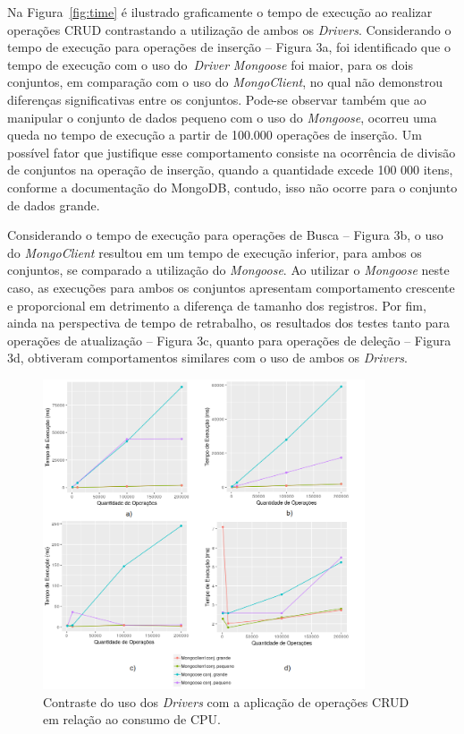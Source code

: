\documentclass[12pt]{article}
\begin{document}
Na Figura~\ref{fig:time} é ilustrado graficamente o tempo de execução ao realizar operações CRUD contrastando a utilização de ambos os \emph{Drivers}. Considerando o tempo de execução para operações de inserção -- Figura 3a, foi identificado que o tempo de execução com o uso do~\emph{Driver} \emph{Mongoose} foi maior, para os dois conjuntos, em comparação com o uso do \emph{MongoClient}, no qual não demonstrou diferenças significativas entre os conjuntos. Pode-se observar também que ao manipular o conjunto de dados pequeno com o uso do \emph{Mongoose}, ocorreu uma queda no tempo de execução a partir de 100.000 operações de inserção. Um possível fator que justifique esse comportamento consiste na ocorrência de divisão de conjuntos na operação de inserção, quando a quantidade excede 100 000 itens, conforme a documentação do MongoDB, contudo, isso não ocorre para o conjunto de dados grande.

Considerando o tempo de execução para operações de Busca -- Figura 3b, o uso do \emph{MongoClient} resultou em um tempo de execução inferior, para ambos os conjuntos, se comparado a utilização do \emph{Mongoose}. Ao utilizar o \emph{Mongoose} neste caso, as execuções para ambos os conjuntos apresentam comportamento crescente e proporcional em detrimento a diferença de tamanho dos registros. Por fim, ainda na perspectiva de tempo de retrabalho, os resultados dos testes tanto para operações de atualização -- Figura 3c, quanto para operações de deleção -- Figura 3d, obtiveram comportamentos similares com o uso de ambos os \emph{Drivers}.

\begin{figure}[!ht]
    \centering
    \includegraphics[width=0.85\textwidth]{images/cpuusage}
	 \caption{Contraste do uso dos \emph{Drivers} com a aplicação de operações CRUD em relação ao consumo de CPU.}
    \label{fig:cpuusage}
\end{figure}
\end{document}
